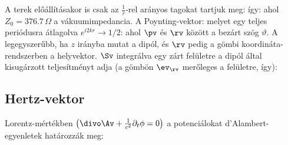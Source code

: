    A terek előállításakor is csak az $\frac{1}{r}$-rel arányos tagokat tartjuk meg:
   így:
   ahol $Z_0=376.7\,\Omega$ a vákuumimpedancia.
   A Poynting-vektor:
   melyet egy teljes periódusra átlagolva $e^{i2kr}\to 1/2$:
   ahol $\pv$ és $\rv$ között a bezárt szög $\vartheta$.
   A legegyszerűbb, ha $z$ irányba mutat a dipól, és $\rv$ pedig a gömbi koordináta-rendszerben a helyvektor. $\Sv$ integrálva egy zárt felületre a dipól által kisugárzott teljesítményt adja (a gömbön $\ev_\rv$ merőleges a felületre, így):
   
  \subsection{Hertz-vektor}
   
   Lorentz-mértékben $\left(\divo \Av+\frac{1}{c^2}\partial_t\phi=0\right)$ a potenciálokat d'Alambert-egyen\-letek határozzák meg:
   
